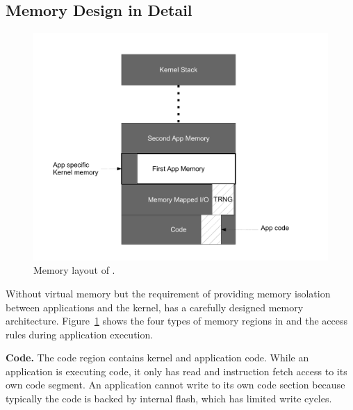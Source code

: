 \subsection{\name Memory Design in Detail}

\begin{figure}
 \centering
\includegraphics[width=1\columnwidth]{img/memory-layout}
\caption{Memory layout of \name.}
 \label{fig:memory-layout}
\end{figure}

Without virtual memory but the requirement of providing memory isolation
between applications and the kernel, \name has a carefully designed memory
architecture.  Figure~\ref{fig:memory-layout} shows the four types of memory
regions in \name and the access rules during application execution.

{\bf Code.}
The code region contains kernel and application code.  While an application is
executing code, it only has read and instruction fetch access to its own code
segment.  An application cannot write to its own code section
because typically
the code is backed by internal flash, which has limited write cycles.

